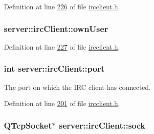 Definition at line \hyperlink{ircclient_8h_source_l00226}{226} of file \hyperlink{ircclient_8h_source}{ircclient.\-h}.

\hypertarget{classserver_1_1irc_client_afaf929882986b927133e126a495e3939}{
\subsubsection[{own\-User}]{ server\-::irc\-Client\-::own\-User\hspace{0.3cm}{\ttfamily [private]}}}\label{d1/d10/classserver_1_1irc_client_afaf929882986b927133e126a495e3939}


Definition at line \hyperlink{ircclient_8h_source_l00227}{227} of file \hyperlink{ircclient_8h_source}{ircclient.\-h}.

\hypertarget{classserver_1_1irc_client_a177e57fc5b5e19d591702644dd2a98e1}{
\subsubsection[{port}]{\setlength{\rightskip}{0pt plus 5cm}int server\-::irc\-Client\-::port\hspace{0.3cm}{\ttfamily [private]}}}\label{d1/d10/classserver_1_1irc_client_a177e57fc5b5e19d591702644dd2a98e1}


The port on which the I\-R\-C client has connected. 



Definition at line \hyperlink{ircclient_8h_source_l00201}{201} of file \hyperlink{ircclient_8h_source}{ircclient.\-h}.

\hypertarget{classserver_1_1irc_client_a9dffc339852e3c1e39983b56b921550c}{
\subsubsection[{sock}]{\setlength{\rightskip}{0pt plus 5cm}Q\-Tcp\-Socket$\ast$ server\-::irc\-Client\-::sock\hspace{0.3cm}{\ttfamily [private]}}}\label{d1/d10/classserver_1_1irc_client_a9dffc339852e3c1e39983b56b921550c}



